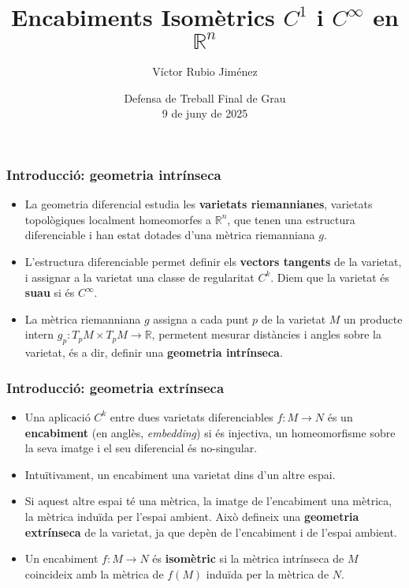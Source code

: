\documentclass[aspectratio=169]{beamer}
\title[Encabiments Isomètrics $C^1$ i $C^\infty$]{Encabiments Isomètrics $C^{1}$ i $C^{\infty}$ en $\mathbb{R}^{n}$}
\author{Víctor Rubio Jiménez}
\institute{Facultat de Matemàtiques i Informàtica \\ Universitat de Barcelona}
\date{Defensa de Treball Final de Grau \\ 9 de juny de 2025}
\begin{document}
\begin{frame}
  \titlepage
\end{frame}

\begin{frame}
  \frametitle{Introducció: geometria intrínseca}
  
  \begin{itemize}
    \item<1-> La geometria diferencial estudia les \textbf{varietats riemannianes}, varietats topològiques localment homeomorfes a $\mathbb{R}^n$, que tenen una estructura diferenciable i han estat dotades d'una mètrica riemanniana $g$.
    \item<2-> L'estructura diferenciable permet definir els \textbf{vectors tangents} de la varietat, i assignar a la varietat una classe de regularitat $C^k$. Diem que la varietat és \textbf{suau} si és $C^\infty$.
    \item<3-> La mètrica riemanniana $g$ assigna a cada punt $p$ de la varietat $M$ un producte intern $g_p: T_pM \times T_pM \to \mathbb{R}$, permetent mesurar distàncies i angles sobre la varietat, és a dir, definir una \textbf{geometria intrínseca}. 
  \end{itemize}
\end{frame}

\begin{frame}
  \frametitle{Introducció: geometria extrínseca}
  
  \begin{itemize}
    \item<1-> Una aplicació $C^k$ entre dues varietats diferenciables $f:M\to N$ és un \textbf{encabiment} (en anglès, \textit{embedding}) si és injectiva, un homeomorfisme sobre la seva imatge i el seu diferencial és no-singular.
    \item<1-> Intuïtivament, un encabiment  una varietat dins d'un altre espai.
    \pause
    \item<2-> Si aquest altre espai té una mètrica, la imatge de l'encabiment  una mètrica, la mètrica induïda per l'espai ambient. Això defineix una \textbf{geometria extrínseca} de la varietat, ja que depèn de l'encabiment i de l'espai ambient.
    \pause
    \item<2-> Un encabiment $f:M\to N$ és \textbf{isomètric} si la mètrica intrínseca de $M$ coincideix amb la mètrica de $f(M)$ induïda per la mètrica de $N$.
  \end{itemize}
\end{frame}
\end{document}
